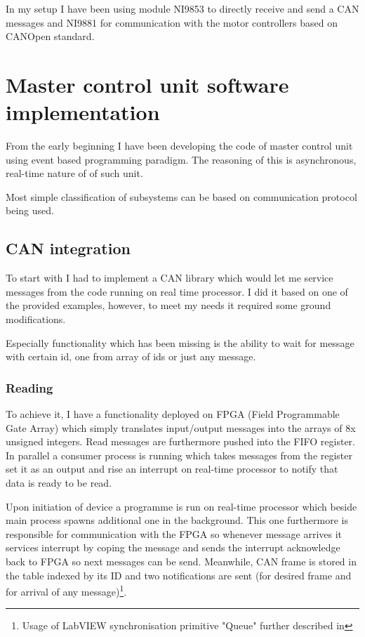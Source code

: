 In my setup I have been using module NI9853 to directly receive and send a CAN messages and NI9881 for communication with the motor controllers based on CANOpen standard.

\section{Master control unit software implementation}
From the early beginning I have been developing the code of master control unit using event based programming paradigm. The reasoning of this is asynchronous, real-time nature of of such unit.

Most simple classification of subsystems can be based on communication protocol being used. 

\subsection{CAN integration}
To start with I had to implement a CAN library which would let me service messages from the code running on real time processor. I did it based on one of the provided examples, however, to meet my needs it required some ground modifications.

Especially functionality which has been missing is the ability to wait for message with certain id, one from array of ids or just any message. 
\subsubsection{Reading}

To achieve it, I have a functionality deployed on FPGA (Field Programmable Gate Array) which simply translates input/output messages into the arrays of 8x unsigned integers. Read messages  are furthermore pushed into the FIFO register. In parallel a consumer process is running which takes messages from the register set it as an output and rise an interrupt on real-time processor to notify that data is ready to be read.

Upon initiation of device a programme is run on real-time processor which beside main process spawns additional one in the background. This one furthermore is responsible for communication with the FPGA so whenever message arrives it services interrupt by coping the message and sends the interrupt acknowledge back to FPGA so next messages can be send. Meanwhile, CAN frame is stored in the table indexed by its ID and two notifications are sent (for desired frame and for arrival of any message)\footnote{Usage of LabVIEW synchronisation primitive "Queue" further described in }.

